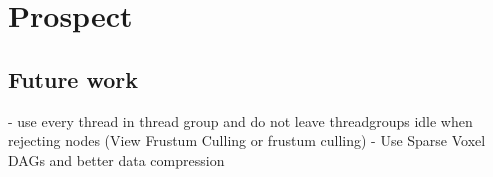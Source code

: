 \chapter{Prospect} \label{cpt-prospect}



\section{Future work}

- use every thread in thread group and do not leave threadgroups idle when rejecting nodes (View Frustum Culling or frustum culling)
- Use Sparse Voxel DAGs and better data compression
